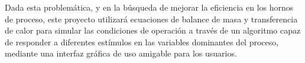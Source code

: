 \par Dada esta problemática, y en la búsqueda de mejorar la eficiencia en los hornos de proceso, este proyecto utilizará ecuaciones de balance de masa y transferencia de calor para simular las condiciones de operación a través de un algoritmo capaz de responder a diferentes estímulos en las variables dominantes del proceso, mediante una interfaz gráfica de uso amigable para los usuarios.